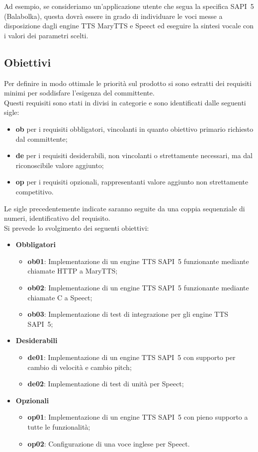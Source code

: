 Ad esempio, se consideriamo un'applicazione utente che segua la specifica SAPI~5 (Balabolka), questa dovrà essere in grado di individuare le voci messe a disposizione dagli engine TTS MaryTTS e Speect ed eseguire la sintesi vocale con i valori dei parametri scelti.


\subsection{Obiettivi}

Per definire in modo ottimale le priorità sul prodotto si sono estratti dei requisiti minimi per soddisfare l'esigenza del committente.\\
Questi requisiti sono stati in divisi in categorie e sono identificati dalle seguenti sigle:
\begin{itemize}
	\item \textbf{ob} per i requisiti obbligatori, vincolanti in quanto obiettivo primario
	richiesto dal committente;
	\item  \textbf{de} per i requisiti desiderabili, non vincolanti o strettamente necessari,
	ma dal riconoscibile valore aggiunto;
	\item \textbf{op} per i requisiti opzionali, rappresentanti valore aggiunto non
	strettamente competitivo.
\end{itemize}
Le sigle precedentemente indicate saranno seguite da una coppia sequenziale di numeri, identificativo del requisito.\\

Si prevede lo svolgimento dei seguenti obiettivi:
\begin{itemize}
	\item \textbf{Obbligatori}
	\begin{itemize}
		\item \textbf{ob01}: Implementazione di un engine TTS SAPI~5 funzionante mediante chiamate HTTP a MaryTTS;
		\item \textbf{ob02}: Implementazione di un engine TTS SAPI~5 funzionante mediante chiamate C a Speect;
		\item \textbf{ob03}: Implementazione di test di integrazione per gli engine TTS SAPI~5;
	\end{itemize}
	
	\item \textbf{Desiderabili} 
	\begin{itemize}
		\item \textbf{de01}: Implementazione di un engine TTS SAPI~5 con supporto per cambio di velocità e cambio pitch;
		\item \textbf{de02}: Implementazione di test di unità per Speect;
	\end{itemize}
	
	\item \textbf{Opzionali}
	\begin{itemize}
		\item \textbf{op01}: Implementazione di un engine TTS SAPI~5 con pieno supporto a tutte le funzionalità;
		\item \textbf{op02}: Configurazione di una voce inglese per Speect.
	\end{itemize}
\end{itemize}

